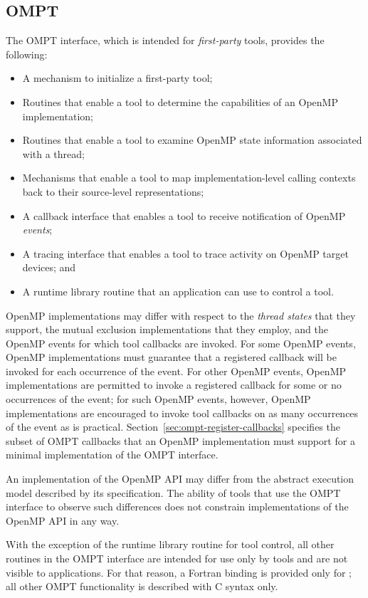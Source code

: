 \subsection{OMPT}

The OMPT interface, which is intended for \emph{first-party} tools,
provides the following:
\begin{itemize}
\item A mechanism to initialize a first-party tool;
\item Routines that enable a tool to determine the capabilities of an
      OpenMP implementation;
\item Routines that enable a tool to examine OpenMP state information 
      associated with a thread;
\item Mechanisms that enable a tool to map implementation-level calling
      contexts back to their source-level representations;
\item A callback interface that enables a tool to receive notification
      of OpenMP \emph{events};
\item A tracing interface that enables a tool to trace activity on OpenMP 
      target devices; and
\item A runtime library routine that an application can use to control a tool.
\end{itemize}

OpenMP implementations may differ with respect to the \emph{thread states} that
they support, the mutual exclusion implementations that they employ,
and the OpenMP events for which tool callbacks are invoked. For some OpenMP events,
OpenMP implementations must guarantee that a registered callback will be invoked 
for each occurrence of the event. For other OpenMP events, OpenMP implementations 
are permitted to invoke a registered callback for some or no occurrences of the 
event; for such OpenMP events, however, OpenMP implementations are encouraged to 
invoke tool callbacks on as many occurrences of the event as is practical.
Section~\ref{sec:ompt-register-callbacks} specifies the subset of OMPT
callbacks that an OpenMP implementation must support for a minimal
implementation of the OMPT interface.

An implementation of the OpenMP API may differ from the
abstract execution model described by its specification.  The ability
of tools that use the OMPT interface to observe such differences does 
not constrain implementations of the OpenMP API in any way.

With the exception of the  runtime library routine for 
tool control, all other routines in the OMPT interface are intended for use 
only by tools and are not visible to applications. For that reason, a Fortran 
binding is provided only for ; all other OMPT functionality 
is described with C syntax only.

